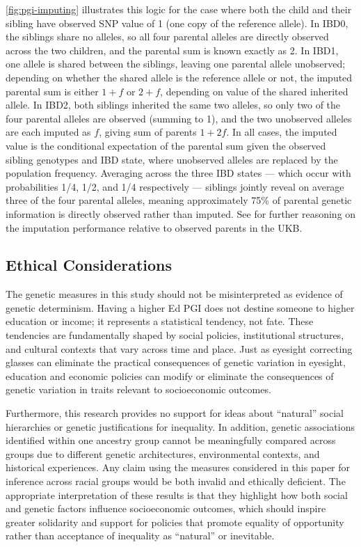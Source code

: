\autoref{fig:pgi-imputing} illustrates this logic for the case where both the child and their sibling have observed SNP value of 1 (one copy of the reference allele).
In IBD0, the siblings share no alleles, so all four parental alleles are directly observed across the two children, and the parental sum is known exactly as 2.
In IBD1, one allele is shared between the siblings, leaving one parental allele unobserved; depending on whether the shared allele is the reference allele or not, the imputed parental sum is either $1 + f$ or $2 + f$, depending on value of the shared  inherited allele.
In IBD2, both siblings inherited the same two alleles, so only two of the four parental alleles are observed (summing to 1), and the two unobserved alleles are each imputed as $f$, giving sum of parents $1 + 2f$.
In all cases, the imputed value is the conditional expectation of the parental sum given the observed sibling genotypes and IBD state, where unobserved alleles are replaced by the population frequency.
Averaging across the three IBD states --- which occur with probabilities 1/4, 1/2, and 1/4 respectively --- siblings jointly reveal on average three of the four parental alleles, meaning approximately 75\% of parental genetic information is directly observed rather than imputed.
See \cite{young2022mendelian} for further reasoning on the imputation performance relative to observed parents in the UKB.

\subsection{Ethical Considerations}
\label{sec:ethics}
The genetic measures in this study should not be misinterpreted as evidence of genetic determinism.
Having a higher Ed PGI does not destine someone to higher education or income; it represents a statistical tendency, not fate.
These tendencies are fundamentally shaped by social policies, institutional structures, and cultural contexts that vary across time and place.
Just as eyesight correcting glasses  can eliminate the practical consequences of genetic variation in eyesight, education and economic policies can modify or eliminate the consequences of genetic variation in traits relevant to socioeconomic outcomes.

Furthermore, this research provides no support for ideas about ``natural'' social hierarchies or genetic justifications for inequality.
In addition, genetic associations identified within one ancestry group cannot be meaningfully compared across groups due to different genetic architectures, environmental contexts, and historical experiences.
Any claim using the measures considered in this paper for inference across racial groups would be both invalid and ethically deficient.
The appropriate interpretation of these results is that they highlight how both social and genetic factors influence socioeconomic outcomes, which should inspire greater solidarity and support for policies that promote equality of opportunity rather than acceptance of inequality as ``natural'' or inevitable.
